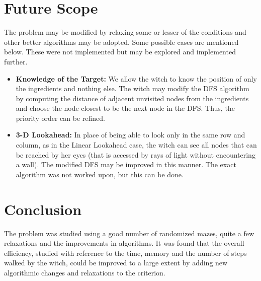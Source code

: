 \documentclass{article} %
\begin{document}
\section{Future Scope}
The problem may be modified by relaxing some or lesser of the conditions and other better algorithms may be adopted. Some possible cases are mentioned below. These were not implemented but may be explored and implemented further.
\begin{itemize}
    \item \textbf{Knowledge of the Target:} We allow the witch to know the position of only the ingredients and nothing else. The witch may modify the DFS algorithm by computing the distance of adjacent unvisited nodes from the ingredients and choose the node closest to be the next node in the DFS. Thus, the priority order can be refined.
    \item \textbf{3-D Lookahead:} In place of being able to look only in the same row and column, as in the Linear Lookahead case, the witch can see all nodes that can be reached by her eyes (that is accessed by rays of light without encountering a wall). The modified DFS may be improved in this manner. The exact algorithm was not worked upon, but this can be done.
\end{itemize}

\section{Conclusion}
The problem was studied using a good number of randomized mazes, quite a few relaxations and the improvements in algorithms. It was found that the overall efficiency, studied with reference to the time, memory and the number of steps walked by the witch, could be improved to a large extent by adding new algorithmic changes and relaxations to the criterion.
\end{document}
